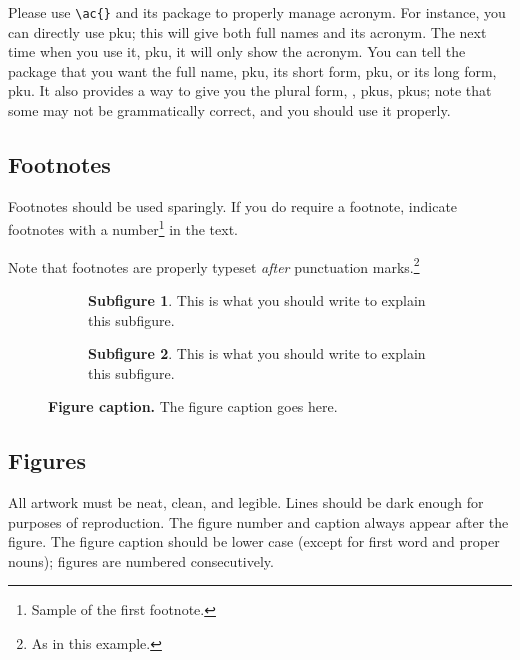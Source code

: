 \documentclass{article}
\begin{document}
Please use \verb+\ac{}+ and its package to properly manage acronym. For instance, you can directly use \ac{pku}; this will give both full names and its acronym. The next time when you use it, \ac{pku}, it will only show the acronym. You can tell the package that you want the full name, \acf{pku}, its short form, \acs{pku}, or its long form, \acl{pku}. It also provides a way to give you the plural form, \eg, \acp{pku}, \aclp{pku}; note that some may not be grammatically correct, and you should use it properly.

\subsection{Footnotes}

Footnotes should be used sparingly.  If you do require a footnote, indicate footnotes with a number\footnote{Sample of the first footnote.} in the text.

Note that footnotes are properly typeset \emph{after} punctuation
marks.\footnote{As in this example.}

\begin{figure}[t!]
     \centering
     \begin{subfigure}[b]{0.48\linewidth}
        \centering
        \fbox{\rule[-.5cm]{0cm}{4cm} \rule[-.5cm]{4cm}{0cm}}
        \caption{\textbf{Subfigure 1}. This is what you should write to explain this subfigure.}
        \label{fig:sub1}
     \end{subfigure}%
     \hfill%
     \begin{subfigure}[b]{0.48\linewidth}
        \centering
        \fbox{\rule[-.5cm]{0cm}{4cm} \rule[-.5cm]{4cm}{0cm}}
        \caption{\textbf{Subfigure 2}. This is what you should write to explain this subfigure.}
        \label{fig:sub2}
     \end{subfigure}
     \caption{\textbf{Figure caption.} The figure caption goes here.}
\end{figure}

\subsection{Figures}

All artwork must be neat, clean, and legible. Lines should be dark enough for purposes of reproduction. The figure number and caption always appear after the figure. The figure caption should be lower case (except for first word and proper nouns); figures are numbered consecutively. 
\end{document}
